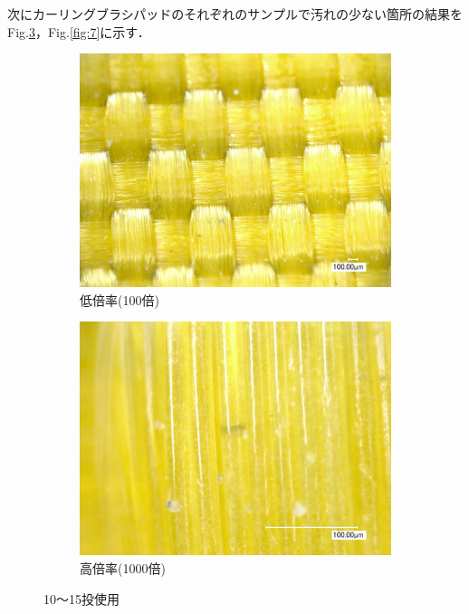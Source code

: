 \documentclass[main]{subfiles}
\begin{document}
次にカーリングブラシパッドのそれぞれのサンプルで汚れの少ない箇所の結果をFig.\ref{fig:6}，Fig.\ref{fig:7}に示す．



\begin{figure}[H]
    \centering
    \begin{subfigure}[htbp]{0.45\linewidth}
        \centering
        \includegraphics[keepaspectratio, width=0.8\linewidth]{figures/中心/カーリングパッド10-15低倍率.jpg}
        \caption{低倍率(100倍)}
        \label{fig:label}
    \end{subfigure}
    \begin{subfigure}[htbp]{0.45\linewidth}
        \centering
        \includegraphics[keepaspectratio, width=0.8\linewidth]{figures/中心/カーリングパッド10-15.jpg}
        \caption{高倍率(1000倍)}
        \label{fig:label}
    \end{subfigure}
    \caption{10～15投使用}
    \label{fig:6}
\end{figure}
\end{document}
